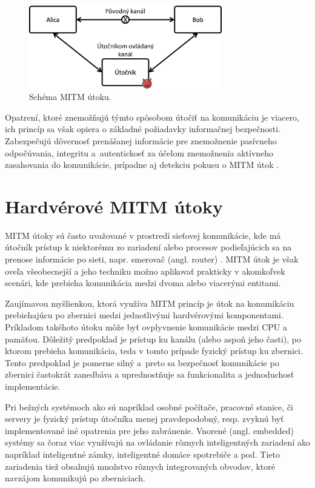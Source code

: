 \begin{figure}
    \centerline{\includegraphics[width=0.75\textwidth]{images/misc/mitm.png}}
    \caption[Schéma MITM útoku]{Schéma MITM útoku.}
    \label{obr:mitm}
\end{figure}

Opatrení, ktoré znemožňujú týmto spôsobom útočiť na komunikáciu je viacero, ich princíp sa však opiera o základné požiadavky informačnej bezpečnosti. Zabezpečujú dôvernosť prenášanej informácie pre znemožnenie pasívneho odpočúvania, integritu a~autentickosť za účelom znemožnenia aktívneho zasahovania do komunikácie, prípadne aj detekciu pokusu o MITM útok \cite{mitmTheory}. 

\section{Hardvérové MITM útoky}
MITM útoky sú často uvažované v prostredí sieťovej komunikácie, kde má útočník prístup k niektorému zo zariadení alebo procesov podieľajúcich sa na prenose informácie po sieti, napr. smerovač (angl. router) \cite{mitmTheory}. MITM útok je však oveľa všeobecnejší a jeho techniku možno aplikovať prakticky v akomkoľvek scenári, kde prebieha komunikácia medzi dvoma alebo viacerými entitami.

Zaujímavou myšlienkou, ktorá využíva MITM princíp je útok na komunikáciu prebiehajúcu po zbernici medzi jednotlivými hardvérovými komponentami. Príkladom takéhoto útoku môže byť ovplyvnenie komunikácie medzi CPU a pamäťou. Dôležitý predpoklad je prístup ku kanálu (alebo aspoň jeho časti), po ktorom prebieha komunikácia, teda v tomto prípade fyzický prístup ku zbernici. Tento predpoklad je pomerne silný a~preto sa bezpečnosť komunikácie po zbernici častokrát zanedbáva a uprednostňuje sa funkcionalita a jednoduchosť implementácie.

Pri bežných systémoch ako sú napríklad osobné počítače, pracovné stanice, či servery je fyzický prístup útočníka menej pravdepodobný, resp. zvyknú byť implementované iné opatrenia pre jeho zabránenie. Vnorené (angl. embedded) systémy sa čoraz viac využívajú na ovládanie rôznych inteligentných zariadení ako napríklad inteligentné zámky, inteligentné domáce spotrebiče a pod. Tieto zariadenia tiež obsahujú množstvo rôznych integrovaných obvodov, ktoré navzájom komunikujú po zberniciach.

